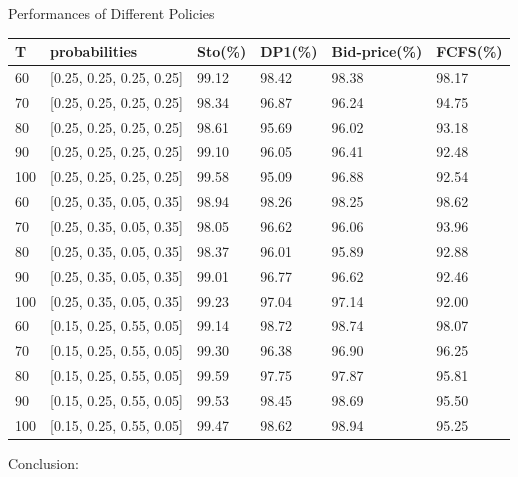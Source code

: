     \begin{frame}{Performances of Different Policies}
        \scriptsize
        \begin{table}[ht]
          \centering
          \begin{tabular}{|l|l|l|l|l|l|}
          \hline
           T & probabilities & Sto(\%) & DP1(\%) & Bid-price(\%) & FCFS(\%) \\
          \hline
           60  & [0.25, 0.25, 0.25, 0.25]  & 99.12 & 98.42 & 98.38 & 98.17 \\
           70  & [0.25, 0.25, 0.25, 0.25]  & 98.34 & 96.87 & 96.24 & 94.75 \\
           80  & [0.25, 0.25, 0.25, 0.25]  & 98.61 & 95.69 & 96.02 & 93.18 \\
           90  & [0.25, 0.25, 0.25, 0.25]  & 99.10 & 96.05 & 96.41 & 92.48 \\
           100 & [0.25, 0.25, 0.25, 0.25]  & 99.58 & 95.09 & 96.88 & 92.54 \\
           \hline
           60  & [0.25, 0.35, 0.05, 0.35]  & 98.94 & 98.26 & 98.25 & 98.62 \\
           70  & [0.25, 0.35, 0.05, 0.35]  & 98.05 & 96.62 & 96.06 & 93.96 \\
           80  & [0.25, 0.35, 0.05, 0.35]  & 98.37 & 96.01 & 95.89 & 92.88 \\
           90  & [0.25, 0.35, 0.05, 0.35]  & 99.01 & 96.77 & 96.62 & 92.46 \\
           100 & [0.25, 0.35, 0.05, 0.35]  & 99.23 & 97.04 & 97.14 & 92.00 \\
          \hline
          60  & [0.15, 0.25, 0.55, 0.05]  & 99.14 & 98.72 & 98.74 & 98.07 \\
          70  & [0.15, 0.25, 0.55, 0.05]  & 99.30 & 96.38 & 96.90 & 96.25 \\
          80  & [0.15, 0.25, 0.55, 0.05]  & 99.59 & 97.75 & 97.87 & 95.81 \\
          90  & [0.15, 0.25, 0.55, 0.05]  & 99.53 & 98.45 & 98.69 & 95.50 \\
          100 & [0.15, 0.25, 0.55, 0.05]  & 99.47 & 98.62 & 98.94 & 95.25 \\
          \hline
          \end{tabular}
        \end{table}
        Conclusion:
    \end{frame}
      
